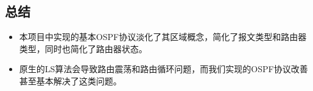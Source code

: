 	\subsection{总结} %
	\label{sub:总结}
		\begin{itemize}
			\item 本项目中实现的基本OSPF协议淡化了其区域概念，简化了报文类型和路由器类型，同时也简化了路由器状态。
			\item 原生的LS算法会导致路由震荡和路由循环问题，而我们实现的OSPF协议改善甚至基本解决了这类问题。
		\end{itemize}
		
	

